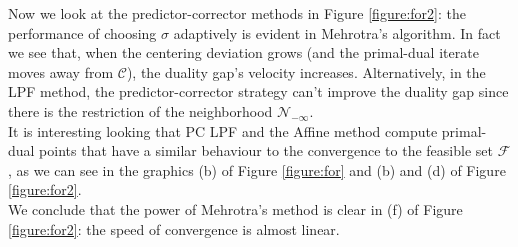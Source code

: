 \documentclass[a4paper,10 pt,titlepage,twoside]{book}
\theoremstyle{plain}
\theoremstyle{definition}
\theoremstyle{remark}
\begin{document}
Now we look at the predictor-corrector methods in Figure \ref{figure:for2}: the performance of choosing $\sigma$ adaptively is evident in Mehrotra's algorithm.
In fact we see that, when the centering deviation grows (and the primal-dual iterate moves away from $\mathcal{C}$), the duality gap's velocity increases. Alternatively, in the LPF method, the predictor-corrector strategy can't improve the duality gap since there is the restriction of the neighborhood $\mathcal{N}_{-\infty}$.\\
It is interesting looking that PC LPF and the Affine method compute primal-dual points that have a similar behaviour to the convergence to the feasible set $\mathcal{F}$, as we can see in the graphics (b) of Figure \ref{figure:for} and (b) and (d) of Figure \ref{figure:for2}.\\
We conclude that the power of Mehrotra's method is clear in (f) of Figure \ref{figure:for2}: the speed of convergence is almost linear.
\newpage
\end{document}
